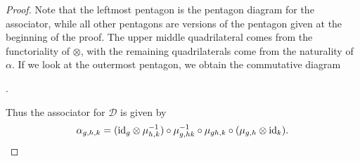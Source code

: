 \begin{proof}
\newpage
\noindent Note that the leftmost pentagon is the pentagon diagram for the associator, while all other pentagons are versions of the pentagon given at the beginning of the proof. The upper middle quadrilateral comes from the functoriality of $\otimes$, with the remaining quadrilaterals come from the naturality of $\alpha$. If we look at the outermost pentagon, we obtain the commutative diagram
\begin{center}
.
\end{center}
\noindent Thus the associator for $\mathcal{D}$ is given by
\begin{align*}
\begin{split}
\alpha_{g,h,k} = (\textup{id}_g \otimes \mu_{h,k}^{-1}) \circ \mu_{g,hk}^{-1} \circ \mu_{gh,k} \circ (\mu_{g,h} \otimes \textup{id}_k).
\end{split}
\end{align*}

\end{proof}
